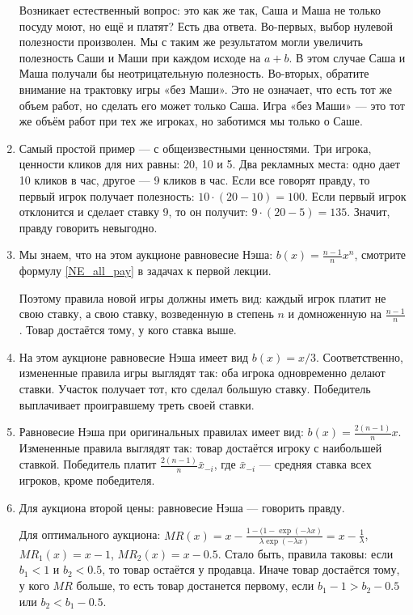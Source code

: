 \begin{enumerate}
Возникает естественный вопрос: это как же так, Саша и Маша не только посуду моют, но ещё и платят? Есть два ответа. Во-первых, выбор нулевой полезности произволен. Мы с таким же результатом могли увеличить полезность Саши и Маши при каждом исходе на $ a+b $. В этом случае Саша и Маша получали бы неотрицательную полезность. Во-вторых, обратите внимание на трактовку игры «без Маши». Это не означает, что есть тот же объем работ, но сделать его может только Саша. Игра «без Маши» — это тот же объём работ при тех же игроках, но заботимся мы только о Саше.

\item Самый простой пример — с общеизвестными ценностями. Три игрока, ценности кликов для них равны: 20, 10 и 5. Два рекламных места: одно дает 10 кликов в час, другое — 9 кликов в час. Если все говорят правду, то первый игрок получает полезность: $ 10\cdot (20-10)=100 $. Если первый игрок отклонится и сделает ставку 9, то он получит: $ 9\cdot (20-5)=135 $. Значит, правду говорить невыгодно.

\item Мы знаем, что на этом аукционе равновесие Нэша: $ b(x)=\frac{n-1}{n}x^{n} $, смотрите формулу \ref{NE_all_pay} в задачах к первой лекции.

Поэтому правила новой игры должны иметь вид: каждый игрок платит не свою ставку, а свою ставку, возведенную в степень $ n $ и домноженную на $ \frac{n-1}{n} $. Товар достаётся тому, у кого ставка выше.


\item На этом аукционе равновесие Нэша имеет вид $ b(x)=x/3 $. Соответственно, измененные правила игры выглядят так: оба игрока одновременно делают ставки. Участок получает тот, кто сделал большую ставку. Победитель выплачивает проигравшему треть своей ставки.

\item Равновесие Нэша при оригинальных правилах имеет вид: $ b(x)=\frac{2(n-1)}{n}x $. Измененные правила выглядят так: товар достаётся игроку с наибольшей ставкой. Победитель платит $ \frac{2(n-1)}{n}\bar{x}_{-i} $, где $ \bar{x}_{-i} $ — средняя ставка всех игроков, кроме победителя.

\item Для аукциона второй цены: равновесие Нэша — говорить правду.

Для оптимального аукциона: $ MR(x)=x-\frac{1-(1-\exp(-\lambda x)}{\lambda \exp(-\lambda x)}=x-\frac{1}{\lambda} $, $ MR_{1}(x)=x-1 $, $ MR_{2}(x)=x-0.5 $.  Стало быть, правила таковы: если $ b_{1}<1 $ и $ b_{2}<0.5 $, то товар остаётся у продавца. Иначе товар достаётся тому, у кого $ MR $ больше, то есть товар достанется первому, если $ b_{1}-1>b_{2}-0.5 $ или
$b_{2}<b_{1}-0.5$.


\end{enumerate}
